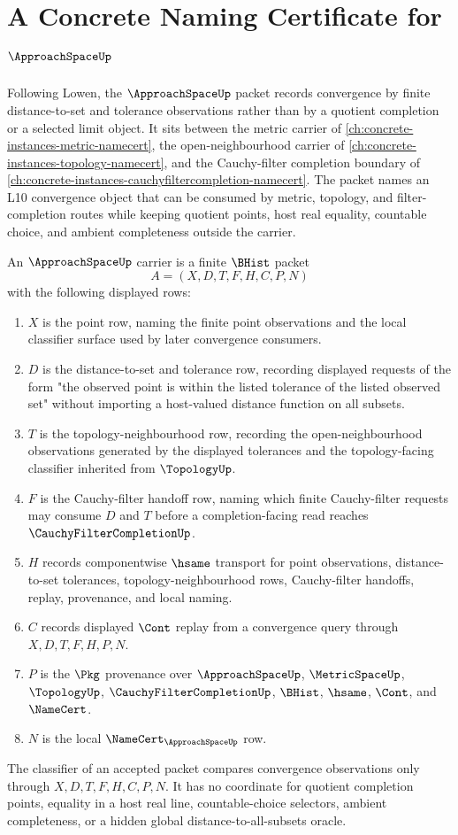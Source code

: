 \chapter{A Concrete Naming Certificate for $\ApproachSpaceUp$}
\label{ch:concrete-instances-approach-space-namecert}

Following Lowen, the $\ApproachSpaceUp$ packet records convergence by finite distance-to-set and tolerance observations rather than by a quotient completion or a selected limit object. It sits between the metric carrier of \autoref{ch:concrete-instances-metric-namecert}, the open-neighbourhood carrier of \autoref{ch:concrete-instances-topology-namecert}, and the Cauchy-filter completion boundary of \autoref{ch:concrete-instances-cauchyfiltercompletion-namecert}. The packet names an L10 convergence object that can be consumed by metric, topology, and filter-completion routes while keeping quotient points, host real equality, countable choice, and ambient completeness outside the carrier.

\begin{definition}
\label{def:approach-space-carrier}
An $\ApproachSpaceUp$ carrier is a finite $\BHist$ packet
$$
A=(X,D,T,F,H,C,P,N)
$$
with the following displayed rows:
\begin{enumerate}
\item $X$ is the point row, naming the finite point observations and the local classifier surface used by later convergence consumers.
\item $D$ is the distance-to-set and tolerance row, recording displayed requests of the form "the observed point is within the listed tolerance of the listed observed set" without importing a host-valued distance function on all subsets.
\item $T$ is the topology-neighbourhood row, recording the open-neighbourhood observations generated by the displayed tolerances and the topology-facing classifier inherited from $\TopologyUp$.
\item $F$ is the Cauchy-filter handoff row, naming which finite Cauchy-filter requests may consume $D$ and $T$ before a completion-facing read reaches $\CauchyFilterCompletionUp$.
\item $H$ records componentwise $\hsame$ transport for point observations, distance-to-set tolerances, topology-neighbourhood rows, Cauchy-filter handoffs, replay, provenance, and local naming.
\item $C$ records displayed $\Cont$ replay from a convergence query through $X,D,T,F,H,P,N$.
\item $P$ is the $\Pkg$ provenance over $\ApproachSpaceUp$, $\MetricSpaceUp$, $\TopologyUp$, $\CauchyFilterCompletionUp$, $\BHist$, $\hsame$, $\Cont$, and $\NameCert$.
\item $N$ is the local $\NameCert_{\ApproachSpaceUp}$ row.
\end{enumerate}
The classifier of an accepted packet compares convergence observations only through $X,D,T,F,H,C,P,N$. It has no coordinate for quotient completion points, equality in a host real line, countable-choice selectors, ambient completeness, or a hidden global distance-to-all-subsets oracle.
\end{definition}

